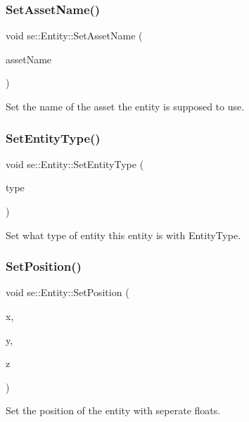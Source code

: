 \subsubsection{\texorpdfstring{Set\+Asset\+Name()}{SetAssetName()}}
{\footnotesize\ttfamily void se\+::\+Entity\+::\+Set\+Asset\+Name (\begin{DoxyParamCaption}\item[{const std\+::string \&}]{asset\+Name }\end{DoxyParamCaption})}

Set the name of the asset the entity is supposed to use. \mbox{\label{classse_1_1_entity_a0550faa593742dbd41284971c24c410e}} 
\subsubsection{\texorpdfstring{Set\+Entity\+Type()}{SetEntityType()}}
{\footnotesize\ttfamily void se\+::\+Entity\+::\+Set\+Entity\+Type (\begin{DoxyParamCaption}\item[{\mbox{\hyperlink{namespacese_ae73a909a94998bc95235eb9b16e405f1}{Entity\+Type}}}]{type }\end{DoxyParamCaption})}

Set what type of entity this entity is with Entity\+Type. \mbox{\label{classse_1_1_entity_a09e198e70620f231106d9f375f7598f3}} 
\subsubsection{\texorpdfstring{Set\+Position()}{SetPosition()}\hspace{0.1cm}{\footnotesize\ttfamily [1/2]}}
{\footnotesize\ttfamily void se\+::\+Entity\+::\+Set\+Position (\begin{DoxyParamCaption}\item[{float}]{x,  }\item[{float}]{y,  }\item[{float}]{z }\end{DoxyParamCaption})}

Set the position of the entity with seperate floats. \mbox{\label{classse_1_1_entity_ae0d37a4774afab2b7abf4118efc57499}} 
